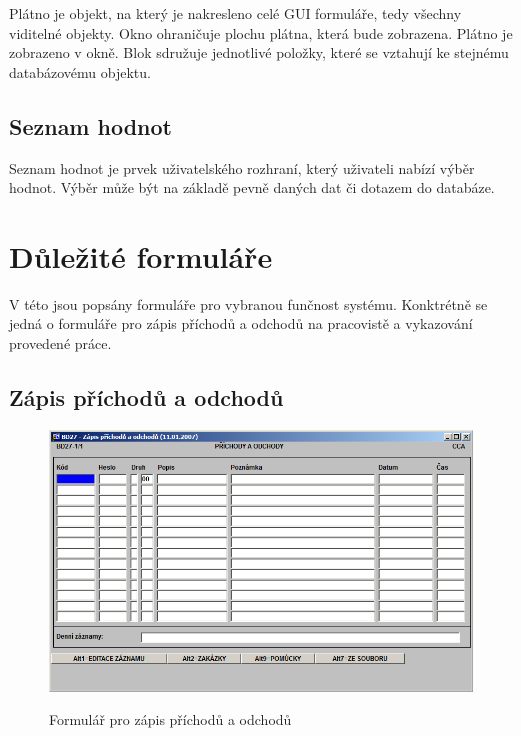 \documentclass{diplomka}
\begin{document}
Plátno je objekt, na který je nakresleno celé GUI formuláře, tedy všechny viditelné objekty.  Okno ohraničuje plochu plátna, která bude zobrazena. Plátno je zobrazeno v okně. Blok sdružuje jednotlivé položky, které se vztahují ke stejnému databázovému objektu.
\subsection*{Seznam hodnot}
Seznam hodnot je prvek uživatelského rozhraní, který uživateli nabízí výběr hodnot. Výběr může být na základě pevně daných dat či dotazem do databáze.

\section{Důležité formuláře}
V této jsou popsány formuláře pro vybranou funčnost systému. 
 Konktrétně se jedná o formuláře pro zápis příchodů a odchodů na pracovistě a vykazování provedené práce.
\subsection{Zápis příchodů a odchodů}
\begin{figure}[H]
  \centering
  \includegraphics[scale=0.7]{obr/BD27.png}
\label{obr:att}
\caption{Formulář pro zápis příchodů a odchodů}
\end{figure}
\end{document}
